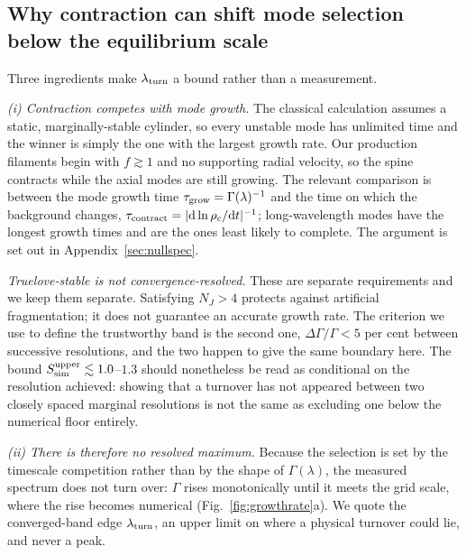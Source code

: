 \documentclass[usenatbib,twoside,twocolumn]{mnras}
\begin{document}
\subsection{Why contraction can shift mode selection below the equilibrium scale}
\label{sec:whyupper}

Three ingredients make $\lambda_{\rm turn}$ a bound rather than a measurement.

\emph{(i) Contraction competes with mode growth.} The classical calculation assumes a static, marginally-stable cylinder, so every unstable mode has unlimited time and the winner is simply the one with the largest growth rate. Our production filaments begin with $f\gtrsim1$ and no supporting radial velocity, so the spine contracts while the axial modes are still growing. The relevant comparison is between the mode growth time $\tau_{\rm grow}=\Gamma(\lambda)^{-1}$ and the time on which the background changes, $\tau_{\rm contract}=|{\rm d}\ln\rho_c/{\rm d}t|^{-1}$; long-wavelength modes have the longest growth times and are the ones least likely to complete. The argument is set out in Appendix~\ref{sec:nullspec}.

\emph{Truelove-stable is not convergence-resolved.} These are separate requirements and we keep them separate. Satisfying $N_J>4$ protects against artificial fragmentation; it does not guarantee an accurate growth rate. The criterion we use to define the trustworthy band is the second one, $\Delta\Gamma/\Gamma<5$ per cent between successive resolutions, and the two happen to give the same boundary here. The bound $S_{\rm sim}^{\rm upper}\lesssim1.0$--$1.3$ should nonetheless be read as conditional on the resolution achieved: showing that a turnover has not appeared between two closely spaced marginal resolutions is not the same as excluding one below the numerical floor entirely.

\emph{(ii) There is therefore no resolved maximum.} Because the selection is set by the timescale competition rather than by the shape of $\Gamma(\lambda)$, the measured spectrum does not turn over: $\Gamma$ rises monotonically until it meets the grid scale, where the rise becomes numerical (Fig.~\ref{fig:growthrate}a). We quote the converged-band edge $\lambda_{\rm turn}$, an upper limit on where a physical turnover could lie, and never a peak.
\end{document}
